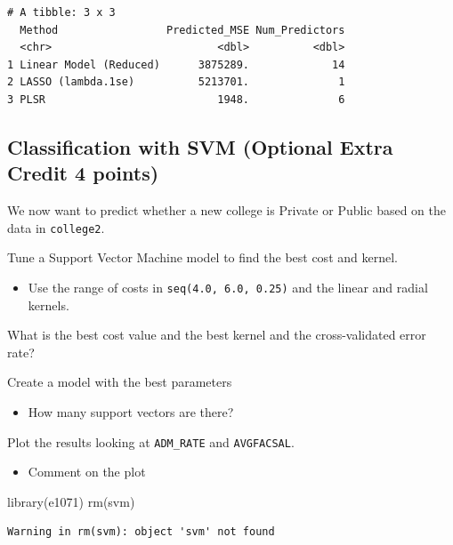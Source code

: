 \documentclass[
  letterpaper,
  DIV=11,
  numbers=noendperiod]{scrartcl}
\newenvironment{Shaded}{\begin{snugshade}}{\end{snugshade}}
\newcommand{\FunctionTok}[1]{\textcolor[rgb]{0.28,0.35,0.67}{#1}}
\newcommand{\NormalTok}[1]{\textcolor[rgb]{0.00,0.23,0.31}{#1}}
\providecommand{\tightlist}{%
  \setlength{\itemsep}{0pt}\setlength{\parskip}{0pt}}\usepackage{longtable,booktabs,array}
\begin{document}
\begin{verbatim}
# A tibble: 3 x 3
  Method                 Predicted_MSE Num_Predictors
  <chr>                          <dbl>          <dbl>
1 Linear Model (Reduced)      3875289.             14
2 LASSO (lambda.1se)          5213701.              1
3 PLSR                           1948.              6
\end{verbatim}

\subsection{Classification with SVM (Optional Extra Credit 4
points)}\label{classification-with-svm-optional-extra-credit-4-points}

We now want to predict whether a new college is Private or Public based
on the data in \texttt{college2}.

Tune a Support Vector Machine model to find the best cost and kernel.

\begin{itemize}
\tightlist
\item
  Use the range of costs in \texttt{seq(4.0,\ 6.0,\ 0.25)} and the
  linear and radial kernels.
\end{itemize}

What is the best cost value and the best kernel and the cross-validated
error rate?

Create a model with the best parameters

\begin{itemize}
\tightlist
\item
  How many support vectors are there?
\end{itemize}

Plot the results looking at \texttt{ADM\_RATE} and \texttt{AVGFACSAL}.

\begin{itemize}
\tightlist
\item
  Comment on the plot
\end{itemize}

\begin{Shaded}
\begin{Highlighting}[]
\FunctionTok{library}\NormalTok{(e1071)}
\FunctionTok{rm}\NormalTok{(svm)}
\end{Highlighting}
\end{Shaded}

\begin{verbatim}
Warning in rm(svm): object 'svm' not found
\end{verbatim}
\end{document}
